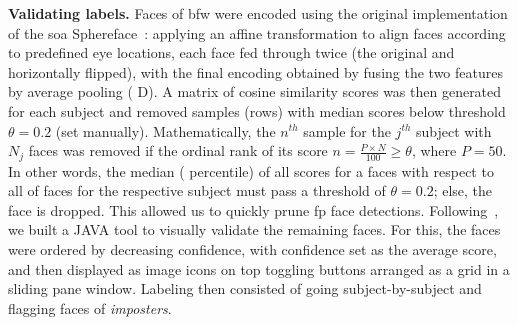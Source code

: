 \vspace{1mm}
\noindent\textbf{Validating labels.} 
Faces of \gls{bfw} were encoded using the original implementation of the \gls{soa} Sphereface~\cite{liu2017sphereface}: applying an affine transformation to align faces according to predefined eye locations, each face fed through twice (\ie the original and horizontally flipped), with the final encoding obtained by fusing the two features by average pooling ( D). A matrix of cosine similarity scores was then generated for each subject and removed samples (\ie rows) with median scores below threshold $\theta=0.2$ (set manually). Mathematically, the $n^{th}$ sample for the $j^{th}$ subject with $N_j$ faces was removed if the ordinal rank of its score $n = \frac{P\times N}{100}\geq\theta$, where $P=50$. In other words, the median ( percentile) of all scores for a faces with respect to all of faces for the respective subject must pass a threshold of $\theta=0.2$; else, the face is dropped. This allowed us to quickly prune \gls{fp} face detections. Following~\cite{robinson2016families, robinson2018visual}, we built a JAVA tool to visually validate the remaining faces. For this, the faces were ordered by decreasing confidence, with confidence set as the average score, and then displayed as image icons on top toggling buttons arranged as a grid in a sliding pane window. Labeling then consisted of going subject-by-subject and flagging faces of \emph{imposters}.

